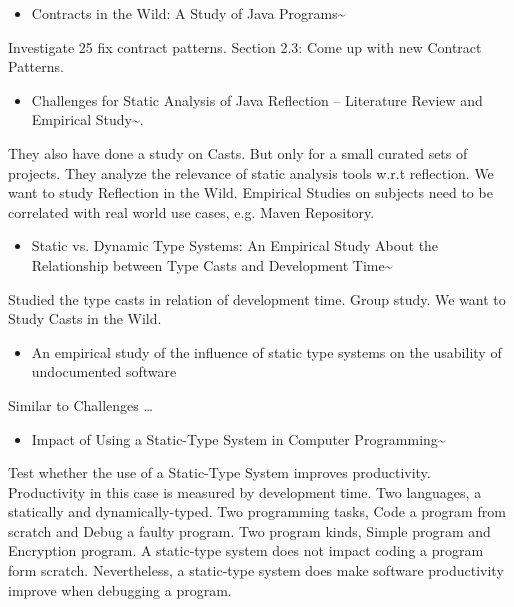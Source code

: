 \documentclass{usiinfdocprop}
\begin{document}
\begin{itemize}
\item Contracts in the Wild: A Study of Java Programs\textasciitilde{}\cite{dietrichetal:LIPIcs:2017:7259}
\end{itemize}
Investigate 25 fix contract patterns. 
Section 2.3: Come up with new Contract Patterns. 

\begin{itemize}
\item Challenges for Static Analysis of Java Reflection -- Literature Review and Empirical Study\textasciitilde{}\cite{Landman:2017:CSA:3097368.3097429}.
\end{itemize}
They also have done a study on Casts. 
But only for a small curated sets of projects. 
They analyze the relevance of static analysis tools w.r.t reflection. 
We want to study Reflection in the Wild. 
Empirical Studies on subjects need to be correlated with real world use cases, e.g. Maven Repository. 

\begin{itemize}
\item Static vs. Dynamic Type Systems: An Empirical Study About the Relationship between Type Casts and Development Time\textasciitilde{}\cite{Stuchlik:2011:SVD:2047849.2047861}
\end{itemize}
Studied the type casts in relation of development time. 
Group study. 
We want to Study Casts in the Wild. 

\begin{itemize}
\item An empirical study of the influence of static type systems on the usability of undocumented software
\end{itemize}
\cite{Mayer:2012:ESI:2384616.2384666} 
Similar to Challenges \ldots{} 

\begin{itemize}
\item Impact of Using a Static-Type System in Computer Programming\textasciitilde{}\cite{7911881}
\end{itemize}
Test whether the use of a Static-Type System improves productivity. 
Productivity in this case is measured by development time. 
Two languages, a statically and dynamically-typed. 
Two programming tasks, Code a program from scratch and Debug a faulty program. 
Two program kinds, Simple program and Encryption program. 
A static-type system does not impact coding a program form scratch. 
Nevertheless, a static-type system does make software productivity improve when debugging a program. 
\end{document}
